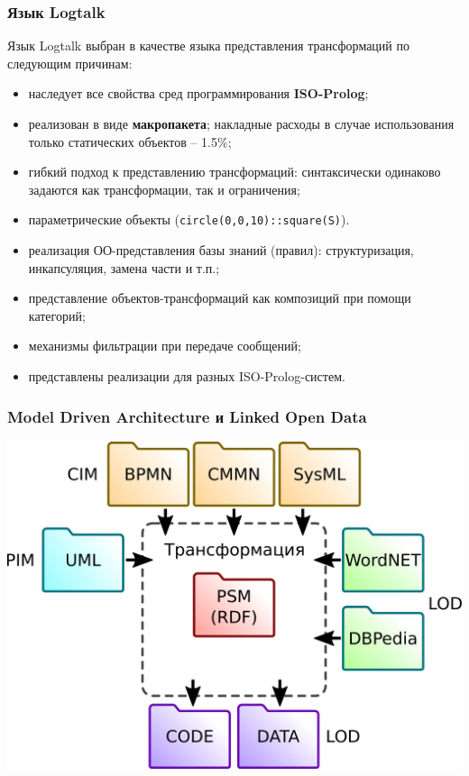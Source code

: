 \documentclass[10pt]{beamer}
\begin{document}
\begin{frame}
  \frametitle{Язык Logtalk}
  Язык Logtalk выбран в качестве языка представления трансформаций по следующим причинам:
  \begin{itemize}
  \item наследует все свойства сред программирования \textbf{ISO-Prolog};
  \item реализован в виде \textbf{макропакета}; накладные расходы в случае использования только статических объектов -- 1.5\%;
  \item гибкий подход к представлению трансформаций: синтаксически одинаково задаются как трансформации, так и ограничения;
  \item параметрические объекты (\texttt{circle(0,0,10)::square(S)}).
  \item реализация ОО-представления базы знаний (правил): структуризация, инкапсуляция, замена части и т.п.;
  \item представление объектов-трансформаций как композиций при помощи категорий;
  \item механизмы фильтрации при передаче сообщений;
  \item представлены реализации для разных ISO-Prolog-систем.
  \end{itemize}
\end{frame}
\begin{frame}
  \frametitle{Model Driven Architecture и Linked Open Data}
  \begin{center}
    \includegraphics[width=0.9\linewidth]{mda-overview-ru.pdf}
  \end{center}
\end{frame}
\end{document}
